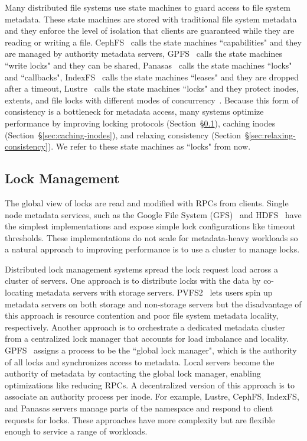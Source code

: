 Many distributed file systems use state machines to guard access to file system
metadata.  These state machines are stored with traditional file system
metadata and they enforce the level of isolation that clients are guaranteed
while they are reading or writing a file. CephFS~\cite{docs:cephcaps,
weil:phdthesis07} calls the state machines ``capabilities" and they are managed
by authority metadata servers, GPFS~\cite{schmuck:fast2002-gpfs} calls the
state machines ``write locks" and they can be shared,
Panasas~\cite{welch:fast08-panasas} calls the state machines ``locks" and
``callbacks", IndexFS~\cite{ren:sc2014-indexfs} calls the state machines
``leases" and they are dropped after a timeout,
Lustre~\cite{schwan_lustre_2003} calls the state machines ``locks" and they
protect inodes, extents, and file locks with different modes of
concurrency~\cite{wang:tech09-lustre}.  Because this form of consistency is a
bottleneck for metadata access, many systems optimize performance by improving
locking protocols (Section~\S\ref{sec:lock-management}), caching inodes
(Section~\S\ref{sec:caching-inodes}), and relaxing consistency
(Section~\S\ref{sec:relaxing-consistency}). We refer to these state machines as
``locks" from now.

\subsection{Lock Management}
\label{sec:lock-management}

The global view of locks are read and modified with RPCs from clients.  Single
node metadata services, such as the Google File System
(GFS)~\cite{ghemawat:sosp2003-gfs} and
HDFS~\cite{shvachko:login2012-hdfs-scalability} have the simplest
implementations and expose simple lock configurations like timeout thresholds.
These implementations do not scale for metadata-heavy workloads so a natural
approach to improving performance is to use a cluster to manage locks.

Distributed lock management systems spread the lock request load across a
cluster of servers. One approach is to distribute locks with the data by
co-locating metadata servers with storage servers.
PVFS2~\cite{devulapalli:ipdps07-pvfs2} lets users spin up metadata servers on
both storage and non-storage servers but the disadvantage of this approach is
resource contention and poor file system metadata locality, respectively.
Another approach is to orchestrate a dedicated metadata cluster from a
centralized lock manager that accounts for load imbalance and locality.
GPFS~\cite{schmuck:fast2002-gpfs} assigns a process to be the ``global lock
manager", which is the authority of all locks and synchronizes access to
metadata. Local servers become the authority of metadata by contacting the
global lock manager, enabling optimizations like reducing RPCs. A decentralized
version of this approach is to associate an authority process per inode. For
example, Lustre, CephFS, IndexFS, and Panasas servers manage parts of the
namespace and respond to client requests for locks. These approaches have more
complexity but are flexible enough to service a range of workloads.

